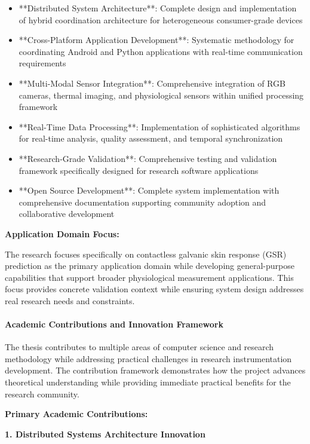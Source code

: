 \documentclass[12pt,a4paper]{report}
\begin{document}
\begin{itemize}
\item **Distributed System Architecture**: Complete design and implementation of hybrid coordination architecture for
  heterogeneous consumer-grade devices
\item **Cross-Platform Application Development**: Systematic methodology for coordinating Android and Python applications
  with real-time communication requirements
\item **Multi-Modal Sensor Integration**: Comprehensive integration of RGB cameras, thermal imaging, and physiological
  sensors within unified processing framework
\item **Real-Time Data Processing**: Implementation of sophisticated algorithms for real-time analysis, quality assessment,
  and temporal synchronization
\item **Research-Grade Validation**: Comprehensive testing and validation framework specifically designed for research
  software applications
\item **Open Source Development**: Complete system implementation with comprehensive documentation supporting community
  adoption and collaborative development

\end{itemize}
\textbf{Application Domain Focus:}

The research focuses specifically on contactless galvanic skin response (GSR) prediction as the primary application
domain while developing general-purpose capabilities that support broader physiological measurement applications. This
focus provides concrete validation context while ensuring system design addresses real research needs and constraints.

\paragraph{Academic Contributions and Innovation Framework}

The thesis contributes to multiple areas of computer science and research methodology while addressing practical
challenges in research instrumentation development. The contribution framework demonstrates how the project advances
theoretical understanding while providing immediate practical benefits for the research community.

\textbf{Primary Academic Contributions:}

\textbf{1. Distributed Systems Architecture Innovation}
\end{document}
